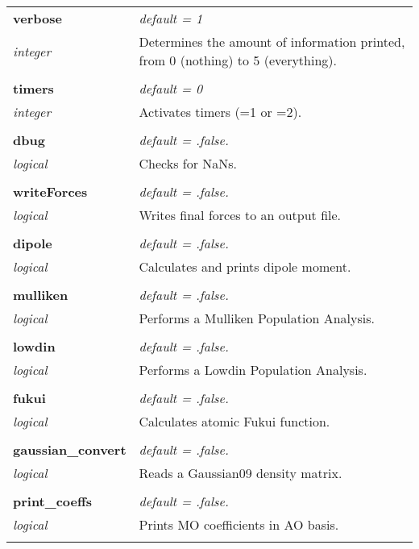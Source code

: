 \begin{Spacing}{1.0}
\begin{longtable}{ p{} p{} }
   \textbf{verbose}
   &  \textit{default = 1 }
   \\*\textit{integer}
   & Determines the amount of information printed, from 
   0 (nothing) to 5 (everything). \\* \\

   \textbf{timers}
   &  \textit{default = 0}
   \\*\textit{integer}
   & Activates timers (=1 or =2).\\* \\

   \textbf{dbug}
   &  \textit{default = .false. }
   \\*\textit{logical}
   & Checks for NaNs. \\* \\

    \textbf{writeForces}
   &  \textit{default = .false. }
   \\*\textit{logical}
   & Writes final forces to an output file.\\* \\

   \textbf{dipole}
   &  \textit{default = .false. }
   \\*\textit{logical}
   & Calculates and prints dipole moment.\\* \\

   \textbf{mulliken}
   &  \textit{default = .false. }
   \\*\textit{logical}
   & Performs a Mulliken Population Analysis.\\* \\

   \textbf{lowdin}
   &  \textit{default = .false. }
   \\*\textit{logical}
   & Performs a Lowdin Population Analysis.\\* \\

   \textbf{fukui}
   &  \textit{default = .false. }
   \\*\textit{logical}
   & Calculates atomic Fukui function.\\* \\

   \textbf{gaussian\_convert}
   &  \textit{default = .false. }
   \\*\textit{logical}
   & Reads a Gaussian09 density matrix.\\* \\

   \textbf{print\_coeffs}
   &  \textit{default = .false. }
   \\*\textit{logical}
   & Prints MO coefficients in AO basis.\\* \\

\end{longtable}
\end{Spacing}
